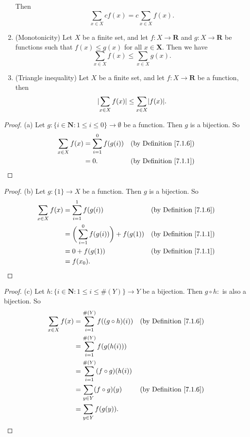 \begin{proposition}
\begin{enumerate}
    Then
    \[
        \sum_{x \in X} cf(x) = c\sum_{x \in X} f(x).
    \]
    \item (Monotonicity) Let \(X\) be a finite set, and let \(f : X \to \mathbf{R}\) and \(g : X \to \mathbf{R}\) be functions such that \(f(x) \leq g(x)\) for all \(x \in \mathbf{X}\).
    Then we have
    \[
        \sum_{x \in X} f(x) \leq \sum_{x \in X} g(x).
    \]
    \item (Triangle inequality) Let \(X\) be a finite set, and let \(f : X \to \mathbf{R}\) be a function, then
    \[
        \lvert\sum_{x \in X} f(x)\rvert \leq \sum_{x \in X} \lvert f(x)\rvert.
    \]
    \end{enumerate}
\end{proposition}

\begin{proof}{(a)}
Let \(g : \{i \in \mathbf{N} : 1 \leq i \leq 0\} \to \emptyset\) be a function.
Then \(g\) is a bijection.
So
\begin{align*}
\sum_{x \in X} f(x) &= \sum_{i = 1}^0 f(g(i)) & \text{(by Definition \ref{7.1.6})} \\
&= 0. & \text{(by Definition \ref{7.1.1})}
\end{align*}
\end{proof}

\begin{proof}{(b)}
Let \(g : \{1\} \to X\) be a function.
Then \(g\) is a bijection.
So
\begin{align*}
\sum_{x \in X} f(x) &= \sum_{i = 1}^1 f(g(i)) & \text{(by Definition \ref{7.1.6})} \\
&= \bigg(\sum_{i = 1}^0 f(g(i))\bigg) + f(g(1)) & \text{(by Definition \ref{7.1.1})} \\
&= 0 + f(g(1)) & \text{(by Definition \ref{7.1.1})} \\
&= f(x_0).
\end{align*}
\end{proof}

\begin{proof}{(c)}
Let \(h : \{i \in \mathbf{N} : 1 \leq i \leq \#(Y)\} \to Y\) be a bijection.
Then \(g \circ h : \) is also a bijection.
So
\begin{align*}
\sum_{x \in X} f(x) &= \sum_{i = 1}^{\#(Y)} f((g \circ h)(i)) & \text{(by Definition \ref{7.1.6})} \\
&= \sum_{i = 1}^{\#(Y)} f(g(h(i))) \\
&= \sum_{i = 1}^{\#(Y)} (f \circ g)(h(i)) \\
&= \sum_{y \in Y} (f \circ g)(y) & \text{(by Definition \ref{7.1.6})} \\
&= \sum_{y \in Y} f(g(y)).
\end{align*}
\end{proof}

